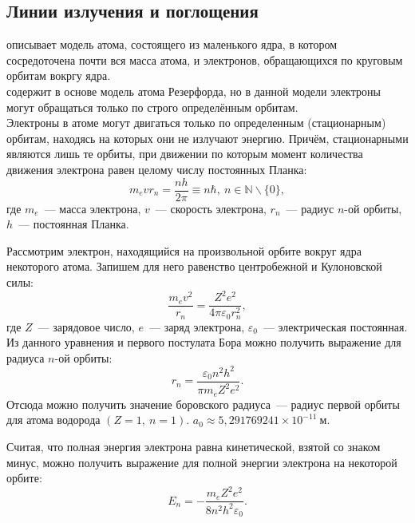 \subsection{Линии излучения и поглощения}

 описывает модель атома, состоящего из маленького ядра, в котором сосредоточена почти вся масса атома, и электронов, обращающихся по круговым орбитам вокргу ядра. \\

 содержит в основе модель атома Резерфорда, но в данной модели электроны могут обращаться только по строго определённым орбитам.\\

 Электроны в атоме могут двигаться только по определенным (стационарным) орбитам, находясь на которых они не излучают энергию.  Причём, стационарными являются лишь те орбиты, при движении по которым момент количества движения электрона равен целому числу постоянных Планка:
\begin{equation}
    m_e v r_n = \frac{n h}{2 \pi} \equiv n \hbar,~n \in \mathbb{N} \backslash \lbrace 0 \rbrace,
\end{equation}
где $m_e$~--- масса электрона, $v$~--- скорость электрона, $r_n$~--- радиус $n$-ой орбиты, $h$~--- постоянная Планка.

Рассмотрим электрон, находящийся на произвольной орбите вокруг ядра некоторого атома. Запишем для него равенство центробежной и Кулоновской силы:
\begin{equation}
    \frac{m_e v^2}{r_n} = \frac{Z^2 e^2}{4 \pi \varepsilon_0 r_n^2},
\end{equation}
где $Z$~--- зарядовое число, $e$~--- заряд электрона, $\varepsilon_0$~--- электрическая постоянная. Из данного уравнения и первого постулата Бора можно получить выражение для радиуса $n$-ой орбиты:
\begin{equation}
    r_n = \frac{\varepsilon_0 n^2 h^2}{\pi m_e Z^2 e^2}.
\end{equation}
Отсюда можно получить значение боровского радиуса~--- радиус первой орбиты для атома водорода $(Z = 1,~n = 1)$. $a_0 \approx 5,291769241 \times 10^{-11}~\text{м}$.

Считая, что полная энергия электрона равна кинетической, взятой со знаком минус, можно получить выражение для полной энергии электрона на некоторой орбите:
\begin{equation}
    E_n = -\frac{m_e Z^2 e^2}{8 n^2 h^2 \varepsilon_0}.
\end{equation}

